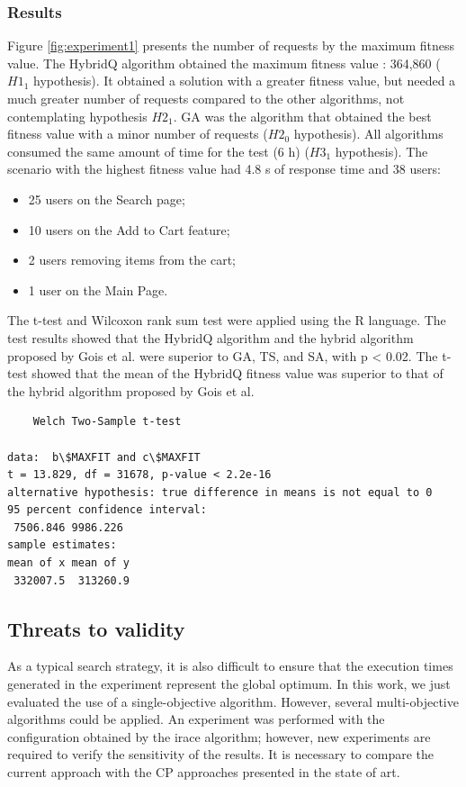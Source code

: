 \documentclass{bmcart}
\begin{document}
\subsubsection{Results}

Figure \ref{fig:experiment1} presents the number of requests by the maximum fitness value. The HybridQ algorithm obtained the maximum fitness value : 364,860 ($H1_{1}$ hypothesis). It obtained a solution with a greater fitness value, but needed a much greater number of requests compared to the other algorithms, not contemplating hypothesis $H2_{1}$. GA was the algorithm that obtained the best fitness value with a minor number of requests ($H2_{0}$ hypothesis). All algorithms consumed the same amount of time for the test (6 h) ($H3_{1}$ hypothesis). The scenario with the highest fitness value had 4.8 s of response time and 38 users:

\begin{itemize}
\item 25 users on the Search page;
\item 10 users on the Add to Cart feature;
\item 2 users removing items from the cart;
\item 1 user on the Main Page. 
\end{itemize}

The t-test and Wilcoxon rank sum test were applied using the R language. The test results showed that the HybridQ algorithm and the hybrid algorithm proposed by Gois et al. were superior to GA, TS, and SA, with p < 0.02. The t-test showed that the mean of the HybridQ fitness value was superior to that of the hybrid algorithm proposed by Gois et al.

\begin{lstlisting}
	Welch Two-Sample t-test

data:  b\$MAXFIT and c\$MAXFIT
t = 13.829, df = 31678, p-value < 2.2e-16
alternative hypothesis: true difference in means is not equal to 0
95 percent confidence interval:
 7506.846 9986.226
sample estimates:
mean of x mean of y 
 332007.5  313260.9 

\end{lstlisting}



\subsection{Threats to validity}

As a typical search strategy, it is also difficult to ensure that the execution times generated in the experiment represent the global optimum. In this work, we just evaluated the use of a single-objective algorithm. However, several multi-objective algorithms could be applied.  An experiment was performed with the configuration obtained by the irace algorithm; however, new experiments are required to verify the sensitivity of the results. It is necessary to compare the current approach with the CP approaches presented in the state of art.
\end{document}
